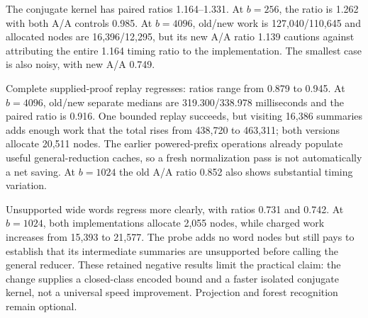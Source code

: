 The conjugate kernel has paired ratios 1.164--1.331. At $b=256$, the
ratio is 1.262 with both A/A controls 0.985. At $b=4096$, old/new work
is 127,040/110,645 and allocated nodes are 16,396/12,295, but its new
A/A ratio 1.139 cautions against attributing the entire 1.164 timing ratio
to the implementation. The smallest case is also noisy, with new A/A 0.749.

Complete supplied-proof replay regresses: ratios range from 0.879 to 0.945.
At $b=4096$, old/new separate medians are 319.300/338.978 milliseconds
and the paired ratio is 0.916. One bounded replay succeeds, but visiting
16,386 summaries adds enough work that the total rises from 438,720 to
463,311; both versions allocate 20,511 nodes. The earlier powered-prefix
operations already populate useful general-reduction caches, so a fresh
normalization pass is not automatically a net saving. At $b=1024$ the
old A/A ratio 0.852 also shows substantial timing variation.

Unsupported wide words regress more clearly, with ratios 0.731 and 0.742.
At $b=1024$, both implementations allocate 2,055 nodes, while charged work
increases from 15,393 to 21,577. The probe adds no word nodes but still
pays to establish that its intermediate summaries are unsupported before
calling the general reducer. These retained negative results limit the
practical claim: the change supplies a closed-class encoded bound and
a faster isolated conjugate kernel, not a universal speed improvement.
Projection and forest recognition remain optional.
